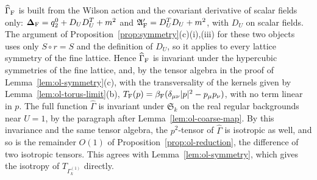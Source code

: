 \begin{remark}[Symmetry]\label{rem:ol-symmetry}
$\widehat\Gamma_{\rm F}$ is built from the Wilson action and the covariant derivative of scalar fields only: $\boldsymbol{\Delta}_{\rm F}=q_2^0+D_UD_U^T+m^2$ and $\mathfrak A'_{\rm F}=D_U^TD_U+m^2$, with $D_U$ on scalar fields. The argument of Proposition~\ref{prop:symmetry}(c)(i),(iii) for these two objects uses only $S\circ r=S$ and the definition of $D_U$, so it applies to every lattice symmetry of the fine lattice. Hence $\widehat\Gamma_{\rm F}$ is invariant under the hypercubic symmetries of the fine lattice, and, by the tensor algebra in the proof of Lemma~\ref{lem:ol-symmetry}(c), with the transversality of the kernels given by Lemma~\ref{lem:ol-torus-limit}(b), $T_{\rm F}(p)=\beta_{\rm F}(\delta_{\mu\nu}|p|^2-p_\mu p_\nu)$, with no term linear in $p$. The full function $\widehat\Gamma$ is invariant under $\mathfrak S_k$ on the real regular backgrounds near $U=1$, by the paragraph after Lemma~\ref{lem:ol-coarse-map}. By this invariance and the same tensor algebra, the $p^2$-tensor of $\widehat\Gamma$ is isotropic as well, and so is the remainder $O(1)$ of Proposition~\ref{prop:ol-reduction}, the difference of two isotropic tensors. This agrees with Lemma~\ref{lem:ol-symmetry}, which gives the isotropy of $T_{\Gamma^{(1)}_k}$ directly.
\end{remark}
